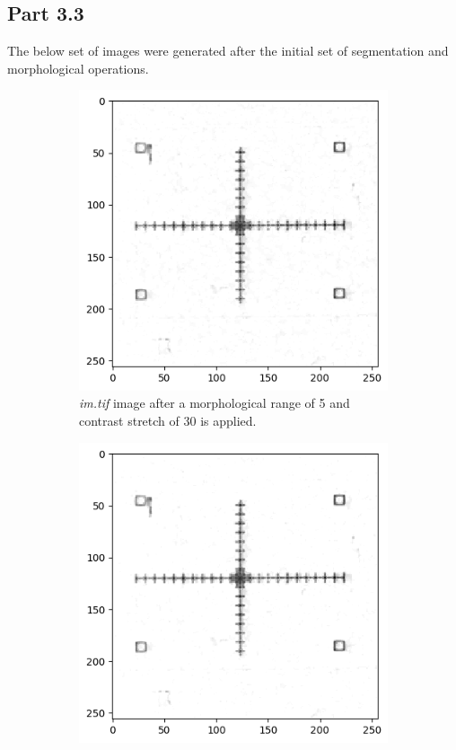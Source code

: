 \documentclass{article}
\begin{document}
\subsection*{Part 3.3}
The below set of images were generated after the initial set of segmentation and morphological operations. 
\begin{figure}[htb]
    \centering 
\begin{subfigure}{0.4\textwidth}
  \includegraphics[width=\linewidth]{Report/Appendix_Images/im_tif_csr_5.png}
  \caption{\emph{im.tif} image after a morphological range of 5 and contrast stretch of 30 is applied. }
  \label{fig:im_tif_contrast_30}
\end{subfigure}\hfil 
\begin{subfigure}{0.4\textwidth}
  \includegraphics[width=\linewidth]{Report/Appendix_Images/im_tif_csr_5_15.png}

\end{subfigure}
\end{figure}
\end{document}
